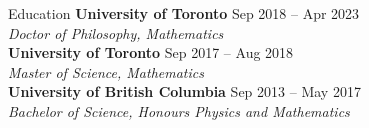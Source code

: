 \documentclass{resume}
\begin{document}
\begin{rSection}{Education}
\textbf{University of Toronto} \hfill {\normalfont Sep 2018 -- Apr 2023} \\
{\normalfont \textit{Doctor of Philosophy, Mathematics}} \\
\textbf{University of Toronto} \hfill {\normalfont Sep 2017 -- Aug 2018} \\
{\normalfont \textit{Master of Science, Mathematics}} \\
\textbf{University of British Columbia} \hfill {\normalfont Sep 2013 -- May 2017}\\
{\normalfont \textit{Bachelor of Science, Honours Physics and Mathematics}}

\end{rSection}

\end{document}
